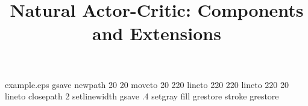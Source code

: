 %
%
%
%
%
\begin{filecontents*}{example.eps}
gsave
newpath
  20 20 moveto
  20 220 lineto
  220 220 lineto
  220 20 lineto
closepath
2 setlinewidth
gsave
  .4 setgray fill
grestore
stroke
grestore
\end{filecontents*}
%
\RequirePackage{fix-cm}
%
\documentclass[smallextended]{svjour3}       %
%
\smartqed  %
%
\usepackage{graphicx}

%
%

\usepackage{natbib} %
\usepackage{amsmath, amssymb}
\usepackage{algorithm}
\usepackage{algorithmic}


\newcommand{\x}{\item}
\newcommand{\parTitle}[1]{\textbf{#1:}}
\DeclareMathOperator{\E}{\mathbb{E}}

%
%

\title{Natural Actor-Critic: Components and Extensions
}


